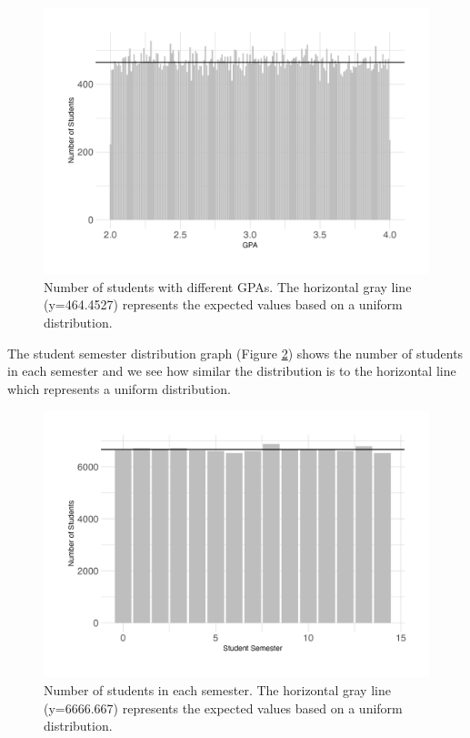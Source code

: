 \documentclass{article}
\begin{document}
\begin{figure}

{\centering \includegraphics[width=0.9\linewidth]{gpa} 

}

\caption{Number of students with different GPAs. The horizontal gray line (y=464.4527) represents the expected values based on a uniform distribution.}\label{fig:gpagraph}
\end{figure}

The student semester distribution graph (Figure \ref{fig:studentsemestergraph}) shows the number of students in each semester and we see how similar the distribution is to the horizontal line which represents a uniform distribution.



\begin{figure}

{\centering \includegraphics[width=0.9\linewidth]{student_semester} 

}

\caption{Number of students in each semester. The horizontal gray line (y=6666.667) represents the expected values based on a uniform distribution.}\label{fig:studentsemestergraph}
\end{figure}
\end{document}
